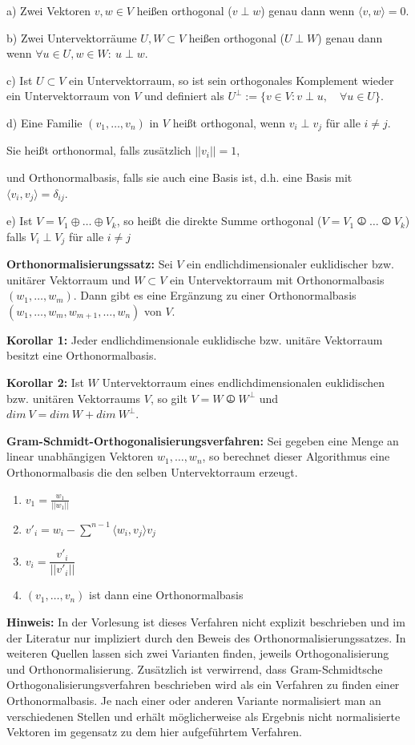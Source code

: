 \documentclass{article}
\begin{document}
a) Zwei Vektoren $v,w\in V$ heißen orthogonal ($v\perp w$) genau dann wenn
$\langle v,w\rangle=0$.

b) Zwei Untervektorräume $U,W\subset V$ heißen orthogonal ($U\perp W$) genau
dann wenn $\forall u\in U,w\in W:\ u\perp w$.

c) Ist $U\subset V$ ein Untervektorraum, so ist sein orthogonales Komplement
wieder ein Untervektorraum von $V$ und definiert als $U^\perp:=\{v\in V:v\perp
u,\quad \forall u\in U\}$.

d) Eine Familie $(v_1,\dots,v_n)$ in $V$ heißt orthogonal, wenn $v_i\perp v_j$
für alle $i\neq j$.

Sie heißt orthonormal, falls zusätzlich $||v_i||=1$,

und Orthonormalbasis, falls sie auch eine Basis ist, d.h. eine Basis
mit $\langle v_i,v_j\rangle=\delta_{ij}$.

e) Ist $V=V_1\oplus\dots\oplus V_k$, so heißt die direkte Summe orthogonal
($V=V_1\operp\dots\operp V_k$) falls $V_i\perp V_j$ für alle $i\neq j$

\textbf{Orthonormalisierungssatz:} Sei $V$ ein endlichdimensionaler
euklidischer bzw. unitärer Vektorraum und $W\subset V$ ein Untervektorraum mit
Orthonormalbasis $(w_1,\dots, w_m)$. Dann gibt es eine Ergänzung zu einer
Orthonormalbasis $(w_1,\dots,w_m, w_{m+1},\dots,w_n)$ von $V$.

\textbf{Korollar 1:} Jeder endlichdimensionale euklidische bzw. unitäre
Vektorraum besitzt eine Orthonormalbasis.

\textbf{Korollar 2:} Ist $W$ Untervektorraum eines endlichdimensionalen
euklidischen bzw. unitären Vektorraums $V$, so gilt $V=W\operp W^\perp$ und
$dim\ V=dim\ W+dim\ W^\perp$.

\textbf{Gram-Schmidt-Orthogonalisierungsverfahren:} Sei gegeben eine Menge an
linear unabhängigen Vektoren $w_1,\dots,w_n$, so berechnet dieser Algorithmus
eine Orthonormalbasis die den selben Untervektorraum erzeugt.

\begin{enumerate}
	\item $v_1=\frac{w_1}{||w_1||}$
	\item $v'_i = w_i - \sum^{n-1} \langle w_i,v_j\rangle v_j$ 
	\item $v_i = \dfrac{v'_i}{||v'_i||}$
	\item $(v_1,\dots, v_n)$ ist dann eine Orthonormalbasis
\end{enumerate}

\textbf{Hinweis:} In der Vorlesung ist dieses Verfahren nicht explizit
beschrieben und im der Literatur nur impliziert durch den Beweis des
Orthonormalisierungssatzes. In weiteren Quellen lassen sich zwei Varianten
finden, jeweils Orthogonalisierung und Orthonormalisierung. Zusätzlich ist
verwirrend, dass Gram-Schmidtsche Orthogonalisierungsverfahren beschrieben wird
als ein Verfahren zu finden einer Orthonormalbasis. Je nach einer oder anderen
Variante normalisiert man an verschiedenen Stellen und erhält möglicherweise
als Ergebnis nicht normalisierte Vektoren im gegensatz zu dem hier aufgeführtem
Verfahren.
\end{document}
